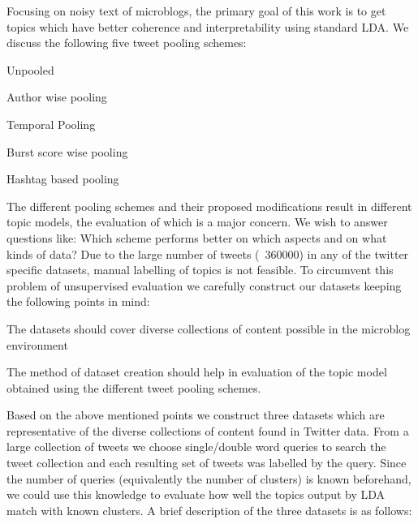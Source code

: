 \documentclass[10pt,a5paper,twoside]{article}
\begin{document}
Focusing on noisy text of microblogs, the primary goal of this work is to get topics which have better coherence and interpretability using standard LDA. We discuss the following five tweet pooling schemes:
\begin{compactitem}
\item Unpooled
\item Author wise pooling
\item Temporal Pooling
\item Burst score wise pooling
\item Hashtag based pooling
\end{compactitem}

The different pooling schemes and their proposed modifications result in different topic models, the evaluation of which is a major concern. We wish to answer questions like: Which scheme performs better on which aspects and on what kinds of data? Due to the large number of tweets (~360000) in any of the twitter specific datasets, manual labelling of topics is not feasible. To circumvent this problem of unsupervised evaluation we carefully construct our datasets keeping the following points in mind:
\begin{compactitem}
\item The datasets should cover diverse collections of content possible in the microblog environment
\item The method of dataset creation should help in evaluation of the topic model obtained using the different tweet pooling schemes.
\end{compactitem}

Based on the above mentioned points we construct three datasets which are representative of the diverse collections of content found in Twitter data. From a large collection of tweets we choose single/double word queries to search the tweet collection and each resulting set of tweets was labelled by the query. Since the number of queries (equivalently the number of clusters) is known beforehand, we could use this knowledge to evaluate how well the topics output by LDA match with known clusters. A brief description of the three datasets is as follows:
\end{document}
